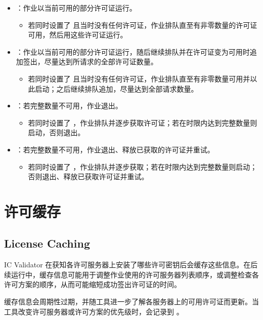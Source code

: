 \begin{itemize}
  \item {}：作业以当前可用的部分许可证运行。
  \begin{itemize}
    \item 若同时设置了  且当时没有任何许可证，作业排队直至有非零数量的许可证可用，然后用这些许可证运行。
  \end{itemize}
  \item {}：作业以当前可用的部分许可证运行，随后继续排队并在许可证变为可用时追加签出，尽量达到所请求的全部许可证数量。
  \begin{itemize}
    \item 若同时设置了  且当时没有任何许可证，作业排队直至有非零数量可用并以此启动；之后继续排队追加，尽量达到全部请求数量。
  \end{itemize}
  \item {}：若完整数量不可用，作业退出。
  \begin{itemize}
    \item 若同时设置了 ，作业排队并逐步获取许可证；若在时限内达到完整数量则启动，否则退出。
  \end{itemize}
  \item {}：若完整数量不可用，作业退出、释放已获取的许可证并重试。
  \begin{itemize}
    \item 若同时设置了 ，作业排队并逐步获取；若在时限内达到完整数量则启动；否则退出、释放已获取许可证并重试。
  \end{itemize}
\end{itemize}

\section{许可缓存}
\subsection*{License Caching}

IC Validator 在获知各许可服务器上安装了哪些许可密钥后会缓存这些信息。在后续运行中，缓存信息可能用于调整作业使用的许可服务器列表顺序，或调整检查各许可方案的顺序，从而可能缩短成功签出许可证的时间。

缓存信息会周期性过期，并随工具进一步了解各服务器上的可用许可证而更新。当工具改变许可服务器或许可方案的优先级时，会记录到 。

